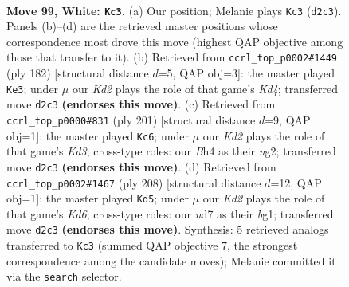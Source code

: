\documentclass[11pt]{article}
\begin{document}
\clearpage

\begin{figure}[p]\centering
\begin{subfigure}{0.46\textwidth}\centering
\resizebox{\linewidth}{!}{%
\newchessgame
\chessboard[
  setfen={7k/3n4/8/5P2/p6B/P6P/3K4/8 w - - 17 99},
  showmover=false,
  pgfstyle=straightmove, color=movearrow, markmove={d2-c3}
]}
\caption{}
\end{subfigure}\hfill
\begin{subfigure}{0.46\textwidth}\centering
\resizebox{\linewidth}{!}{%
\newchessgame
\chessboard[
  setfen={8/8/3k4/5B1p/3K1P1P/8/3n4/8 w - - 1 92},
  showmover=false,
  pgfstyle=straightmove, color=movearrow, markmove={d4-e3}
]}
\caption{}
\end{subfigure}
\\[4pt]
\begin{subfigure}{0.46\textwidth}\centering
\resizebox{\linewidth}{!}{%
\newchessgame
\chessboard[
  setfen={8/8/3k4/p7/P2K4/8/4p1N1/8 b - - 69 101},
  showmover=false,
  pgfstyle=straightmove, color=movearrow, markmove={d6-c6}
]}
\caption{}
\end{subfigure}\hfill
\begin{subfigure}{0.46\textwidth}\centering
\resizebox{\linewidth}{!}{%
\newchessgame
\chessboard[
  setfen={3B4/8/3K2k1/5p2/8/5P1P/8/6b1 w - - 24 105},
  showmover=false,
  pgfstyle=straightmove, color=movearrow, markmove={d6-d5}
]}
\caption{}
\end{subfigure}
\caption{\textbf{Move 99, White: \texttt{Kc3}.} (a) Our position; Melanie plays \texttt{Kc3} (\texttt{d2c3}). Panels (b)--(d) are the retrieved master positions whose correspondence most drove this move (highest QAP objective among those that transfer to it). (b) Retrieved from \texttt{ccrl\_top\_p0002\#1449} (ply 182) [structural distance $d$=5, QAP obj=3]: the master played \texttt{Ke3}; under $\mu$ our \emph{Kd2} plays the role of that game's \emph{Kd4}; transferred move \texttt{d2c3} \textbf{(endorses this move)}. (c) Retrieved from \texttt{ccrl\_top\_p0000\#831} (ply 201) [structural distance $d$=9, QAP obj=1]: the master played \texttt{Kc6}; under $\mu$ our \emph{Kd2} plays the role of that game's \emph{Kd3}; cross-type roles: our \emph{B}h4 as their \emph{n}g2; transferred move \texttt{d2c3} \textbf{(endorses this move)}. (d) Retrieved from \texttt{ccrl\_top\_p0002\#1467} (ply 208) [structural distance $d$=12, QAP obj=1]: the master played \texttt{Kd5}; under $\mu$ our \emph{Kd2} plays the role of that game's \emph{Kd6}; cross-type roles: our \emph{n}d7 as their \emph{b}g1; transferred move \texttt{d2c3} \textbf{(endorses this move)}. Synthesis: 5 retrieved analogs transferred to \texttt{Kc3} (summed QAP objective 7, the strongest correspondence among the candidate moves); Melanie committed it via the \texttt{search} selector.}
\label{fig:thought-m196}
\end{figure}
\end{document}
